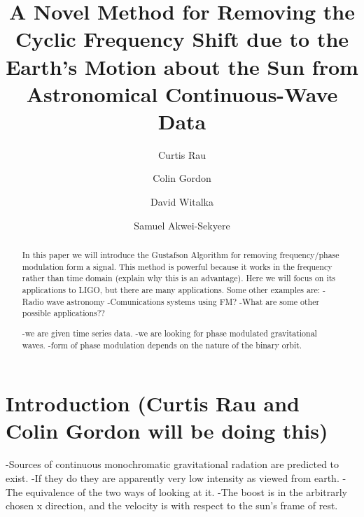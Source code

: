\documentclass[twocolumn, groupedaddress]{revtex4-1}
\begin{document}
\author{Curtis Rau}
\author{Colin Gordon}
\author{David Witalka}
\author{Samuel Akwei-Sekyere}
\title{A Novel Method for Removing the Cyclic Frequency Shift due to the Earth's Motion about the Sun from Astronomical Continuous-Wave Data}

\begin{abstract}
In this paper we will introduce the Gustafson Algorithm for removing frequency/phase modulation form a signal.  This method is powerful because it works in the frequency rather than time domain (explain why this is an advantage).  Here we will focus on its applications to LIGO, but there are many applications.  Some other examples are:
-Radio wave astronomy
-Comunications systems using FM?
-What are some other possible applications??

-we are given time series data.
-we are looking for phase modulated gravitational waves.
-form of phase modulation depends on the nature of the binary orbit.
\citep{Saulson}
\citep{LSCall}
\citep{Deanna}
\citep{folland}
\citep{griffiths}
\end{abstract}

\maketitle



\section{Introduction (Curtis Rau and Colin Gordon will be doing this)}

-Sources of continuous monochromatic gravitational radation are predicted to exist.
-If they do they are apparently very low intensity as viewed from earth.
-The equivalence of the two ways of looking at it.
-The boost is in the arbitrarly chosen x direction, and the velocity is with respect to the sun's frame of rest.
\end{document}
